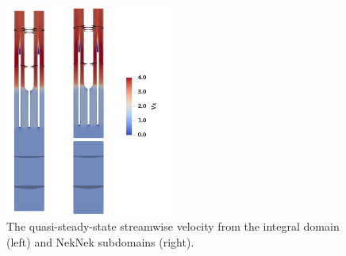 \begin{figure}[!ht]
\centering
\includegraphics[width=0.5\textwidth]{./figures/bundle_neknek_results.png}
\caption{The quasi-steady-state streamwise velocity from the integral domain (left) and NekNek subdomains (right). }
\label{fig:bundle_vel}
\end{figure}

